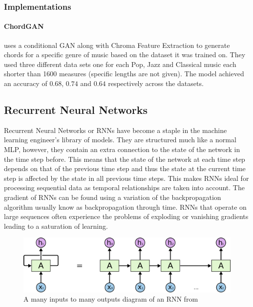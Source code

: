 \subsubsection{Implementations}

\paragraph{ChordGAN} \cite{ChordGAN} uses a conditional GAN along with Chroma Feature Extraction to generate chords for a specific genre of music based on the dataset it was trained on.
They used three different data sets one for each Pop, Jazz and Classical music each shorter than 1600 measures (specific lengths are not given).
The model achieved an accuracy of $0.68$, $0.74$ and $0.64$ respectively across the datasets.

\subsection{Recurrent Neural Networks}

Recurrent Neural Networks or RNNs have become a staple in the machine learning engineer's library of models. 
They are structured much like a normal MLP, however, they contain an extra connection to the state of the network in the time step before.
This means that the state of the network at each time step depends on that of the previous time step and thus the state at the current time step is affected by the state in all previous time steps.
This makes RNNs ideal for processing sequential data as temporal relationships are taken into account.
The gradient of RNNs can be found using a variation of the backpropagation algorithm usually know as backpropagation through time.
RNNs that operate on large sequences often experience the problems of exploding or vanishing gradients leading to a saturation of learning.

\begin{figure}
    \centering
    \includegraphics[width=0.8\columnwidth]{Figures/RNN}
    \decoRule
    \caption[An RNN]{A many inputs to many outputs diagram of an RNN from \cite{oinkina}}
    \label{fig:RNN}
\end{figure}

